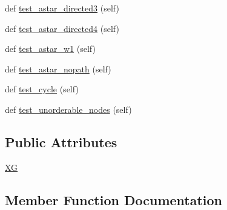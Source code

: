 \begin{DoxyCompactItemize}
\item 
def \hyperlink{classnetworkx_1_1algorithms_1_1shortest__paths_1_1tests_1_1test__astar_1_1TestAStar_a55de63d36b7027b3b5c6cde706580a34}{test\+\_\+astar\+\_\+directed3} (self)
\item 
def \hyperlink{classnetworkx_1_1algorithms_1_1shortest__paths_1_1tests_1_1test__astar_1_1TestAStar_acb49b87671122a2f469349cc787bed2b}{test\+\_\+astar\+\_\+directed4} (self)
\item 
def \hyperlink{classnetworkx_1_1algorithms_1_1shortest__paths_1_1tests_1_1test__astar_1_1TestAStar_ab0945496e865ec89bb3573677ad6fc41}{test\+\_\+astar\+\_\+w1} (self)
\item 
def \hyperlink{classnetworkx_1_1algorithms_1_1shortest__paths_1_1tests_1_1test__astar_1_1TestAStar_af060e66a0cde7a0179cf8bf9dd56b458}{test\+\_\+astar\+\_\+nopath} (self)
\item 
def \hyperlink{classnetworkx_1_1algorithms_1_1shortest__paths_1_1tests_1_1test__astar_1_1TestAStar_acfd6b55f744697525c3b439233e40926}{test\+\_\+cycle} (self)
\item 
def \hyperlink{classnetworkx_1_1algorithms_1_1shortest__paths_1_1tests_1_1test__astar_1_1TestAStar_a16dfe79260241fc532c1bb67765de279}{test\+\_\+unorderable\+\_\+nodes} (self)
\end{DoxyCompactItemize}
\subsection*{Public Attributes}
\begin{DoxyCompactItemize}
\item 
\hyperlink{classnetworkx_1_1algorithms_1_1shortest__paths_1_1tests_1_1test__astar_1_1TestAStar_a7273d64dfa66aee652a531f705809910}{XG}
\end{DoxyCompactItemize}


\subsection{Member Function Documentation}
\mbox{\label{classnetworkx_1_1algorithms_1_1shortest__paths_1_1tests_1_1test__astar_1_1TestAStar_ae5406f2dd304b6c6ea78fec05f29e407}} 
